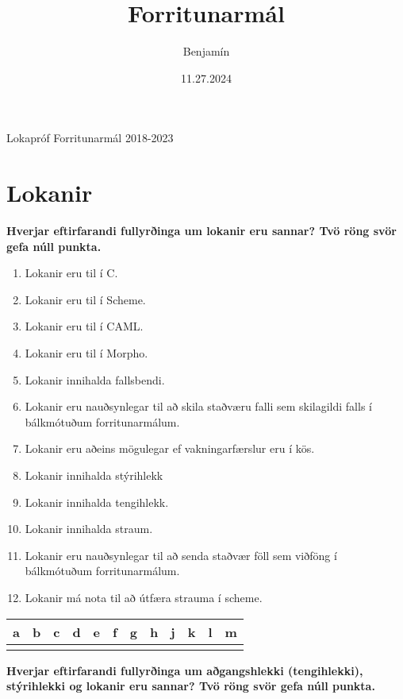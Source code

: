 \documentclass{article}
\title{Forritunarmál}
\author{Benjamín}
\date{11.27.2024}
\newcommand{\bo}[1]{\textbf{#1}}
\newcommand{\enum}{\begin{enumerate}[label = \alph*.]}
\begin{document}
\maketitle

\begin{center}
    \Huge{Lokapróf Forritunarmál 2018-2023}
\end{center}

\newpage

\section{Lokanir}

\bo{Hverjar eftirfarandi fullyrðinga um lokanir eru sannar? Tvö röng
svör gefa núll punkta.}


\enum
\item Lokanir eru til í C.
\item Lokanir eru til í Scheme.
\item Lokanir eru til í CAML.
\item Lokanir eru til í Morpho.
\item Lokanir innihalda fallsbendi.
\item Lokanir eru nauðsynlegar til að skila staðværu falli sem skilagildi
      falls í bálkmótuðum forritunarmálum.
\item Lokanir eru aðeins mögulegar ef vakningarfærslur eru í kös.
\item Lokanir innihalda stýrihlekk
\item Lokanir innihalda tengihlekk.
\item Lokanir innihalda straum.
\item Lokanir eru nauðsynlegar til að senda staðvær föll sem viðföng í bálkmótuðum forritunarmálum.
\item Lokanir má nota til að útfæra strauma í scheme.

\end{enumerate}

\begin{tabularx}{\textwidth}{|X|X|X|X|X|X|X|X|X|X|X|X|}
    \hline
    \bo{a} & \bo{b} & \bo{c} & \bo{d} & \bo{e} & \bo{f} & \bo{g} & \bo{h} & \bo{j} & \bo{k} & \bo{l} & \bo{m} \\ \hline
     & & & & & & & & & & & \\ \hline
\end{tabularx}

\newpage

\bo{Hverjar eftirfarandi fullyrðinga um aðgangshlekki (tengihlekki),
stýrihlekki og lokanir eru sannar? Tvö röng svör gefa núll punkta.}
\end{document}
